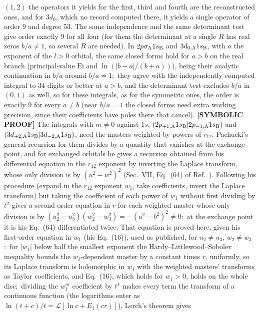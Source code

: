 \documentclass[aps,pra,twocolumn,superscriptaddress,longbibliography]{revtex4-2}
\begin{document}
$(1,2)$ the operators it yields for the first, third and fourth are the reconstructed ones, and
for $3d_{0}$, which no record computed there, it yields a single operator of order $9$ and degree
$53$.  The same independence and the same determinant test give order exactly $9$ for all four
(for them the determinant at a single $R$ has real zeros $b/a\neq1$, so several $R$ are needed).
In $2p\sigma_{\rm A}1s_{\rm B}$ and $3d_{0,{\rm A}}1s_{\rm B}$, with $a$ the exponent of the $l>0$
orbital, the same closed forms hold for $a>b$ on the real branch (principal-value $\mathrm{Ei}$
and $\ln(|b-a|/(b+a))$), being their analytic continuation in $b/a$ around $b/a=1$;\ they agree
with the independently computed integral to $34$ digits or better at $a>b$, and the determinant
test excludes $b/a$ in $(0,1)$ as well, so for these integrals, as for the symmetric ones, the
order is exactly $9$ for every $a\neq b$ (near $b/a=1$ the closed forms need extra working
precision, since their coefficients have poles there that cancel).
\textbf{[SYMBOLIC PROOF]} The integrals with $m\neq0$ against $1s$,
$(2p_{+1,{\rm A}}1s_{\rm B}|2p_{-1,{\rm A}}1s_{\rm B})$ and
$(3d_{+2,{\rm A}}1s_{\rm B}|3d_{-2,{\rm A}}1s_{\rm B})$, need the masters weighted by
powers of $r_{12}$.  Pachucki's general recursion for them divides by a quantity that
vanishes at the exchange point, and for exchanged orbitals he gives a recursion
obtained from his differential equation in the $r_{12}$ exponent by inverting the
Laplace transform, whose only division is by $(u^2-w^2)^2$ (Sec.~VII, Eq.~(64) of
Ref.~\cite{pachucki2009}).  Following his procedure (expand in the $r_{12}$ exponent
$w_1$, take coefficients, invert the Laplace transform) but taking the coefficient
of each power of $w_1$ without first dividing by $t^2$ gives a second-order equation
in $r$ for each weighted master whose only division is by
$(u_2^2-u_3^2)(w_2^2-w_3^2)=-(a^2-b^2)^2\neq0$;\ at the exchange point it is his
Eq.~(64) differentiated twice.  That equation is proved here, given his first-order
equation in $w_1$ (his Eq.~(16)), used as published, for $u_2\neq u_3$, $w_2\neq w_3$:\ for
$|w_1|$ below half the smallest exponent the Hardy--Littlewood--Sobolev inequality
bounds the $w_1$-dependent master by a constant times $r$, uniformly, so its Laplace
transform is holomorphic in $w_1$ with the weighted masters' transforms as Taylor
coefficients, and Eq.~(16), which holds for $w_1>0$, holds on the whole disc;\ dividing
the $w_1^m$ coefficient by $t^4$ makes every term the transform of a continuous function
(the logarithms enter as $\ln(t+c)/t=\mathcal{L}[\ln c+E_1(cr)]$), Lerch's theorem gives
\end{document}
